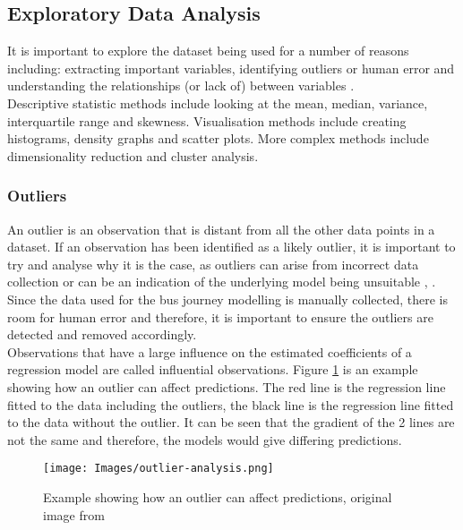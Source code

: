 \subsection{Exploratory Data Analysis}

It is important to explore the dataset being used for a number of reasons including: extracting important variables, identifying outliers or human error and understanding the relationships (or lack of) between variables \cite{significance-of-eda}. \\

Descriptive statistic methods include looking at the mean, median, variance, interquartile range and skewness. Visualisation methods include creating histograms, density graphs and scatter plots. More complex methods include dimensionality reduction and cluster analysis. 

\subsubsection{Outliers}

An outlier is an observation that is distant from all the other data points in a dataset. If an observation has been identified as a likely outlier, it is important to try and analyse why it is the case, as outliers can arise from incorrect data collection or can be an indication of the underlying model being unsuitable \cite{forecasting-book}, \cite{m2s2-notes}. Since the data used for the bus journey modelling is manually collected, there is room for human error and therefore, it is important to ensure the outliers are detected and removed accordingly. \\

Observations that have a large influence on the estimated coefficients of a regression model are called influential observations. Figure \ref{fig:outlier} is an example showing how an outlier can affect predictions. The red line is the regression line fitted to the data including the outliers, the black line is the regression line fitted to the data without the outlier. It can be seen that the gradient of the 2 lines are not the same and therefore, the models would give differing predictions.  

\begin{figure}[H]
\begin{center}
    \texttt{[image: Images/outlier-analysis.png]}
    \caption{Example showing how an outlier can affect predictions, original image from \cite{forecasting-book}}
    \label{fig:outlier}
\end{center}
\end{figure}


